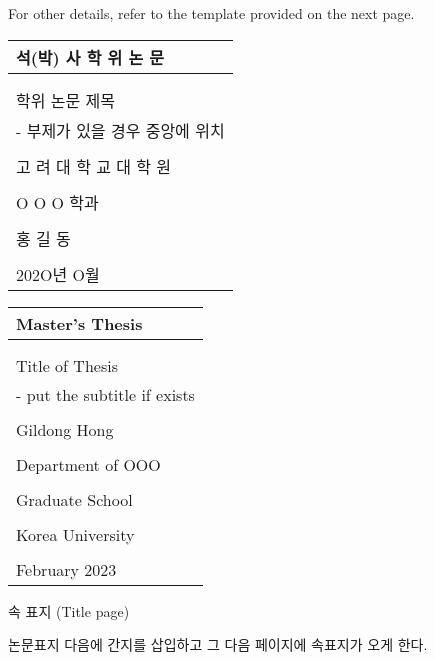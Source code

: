 \documentclass[11pt]{report}
\numberwithin{figure}{section}
\theoremstyle{plain}
\theoremstyle{definition}
\theoremstyle{corollary}
\theoremstyle{definition}
\theoremstyle{plain}
\theoremstyle{definition}
\theoremstyle{plain}
\begin{document}
For other details, refer to the template provided on the next page.


\newpage
\noindent
\begin{tabularx}{\textwidth}{| >{\centering\arraybackslash}X |}
\arrayrulecolor{blue}
\hline
\Large 석(박) 사 학 위 논 문 \\\hline
\rule{0pt}{60pt}\\\hline
\\[-15pt]
\huge 학위 논문 제목\\
\Large - 부제가 있을 경우 중앙에 위치\\
\rule{0pt}{180pt}\\\hline
\LARGE 고 려 대 학 교  대 학 원 \\\hline
\\[-8pt]\hline
\Large O O O 학과\\
\hline
\\[-8pt]\hline
\Large 홍 길 동\\\hline
\rule{0pt}{60pt}\\\hline
\large 202O년  O월 \\\hline
\end{tabularx}

\newpage
\noindent
\begin{tabularx}{\textwidth}{| >{\centering\arraybackslash}X |}
\arrayrulecolor{blue}
\hline
\Large Master's Thesis \\\hline
\rule{0pt}{60pt}\\\hline
\\[-15pt]
\huge Title of Thesis\\
\Large - put the subtitle if exists\\
\rule{0pt}{150pt}\\\hline
\Large Gildong Hong\\
\hline
\\[-8pt]\hline
\Large Department of OOO \\\hline
\rule{0pt}{30pt}\\\hline
\LARGE Graduate School \\\hline
\\[-8pt]\hline
\LARGE Korea University \\\hline
\rule{0pt}{20pt}\\\hline
\large February 2023 \\\hline
\end{tabularx}

\newpage
\begin{center}
\large 속 표지 (Title page)
\end{center}
논문표지 다음에 간지를 삽입하고 그 다음 페이지에 속표지가 오게 한다.
\end{document}
